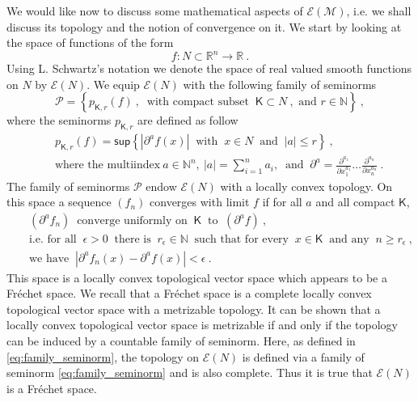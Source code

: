 \documentclass[11pt]{book}
\renewcommand{\sup}{\mathsf{sup}}
\newcommand{\abs}[1]{\left|#1\right|}
\newcommand{\Ecal}{\mathcal{E}}
\newcommand{\Mcal}{\mathcal{M}}
\newcommand{\Pcal}{\mathcal{P}}
\newcommand{\Nbb}{\mathbb{N}}
\newcommand{\Rbb}{\mathbb{R}}
\newcommand{\Ksf}{\mathsf{K}}
\theoremstyle{break}
\begin{document}
We would like now to discuss some mathematical aspects of $\Ecal(\Mcal)$, i.e. we shall discuss its topology and the notion of convergence on it. We start by looking at the space of functions of the form
%
\begin{equation*}
f : N \subset \Rbb^n \to \Rbb \ .
\end{equation*}
%
Using L. Schwartz's notation we denote the space of real valued smooth functions on $N$ by $\Ecal(N)$. We equip $\Ecal(N)$ with the following family of seminorms
%
\begin{equation}
\Pcal = \left\{ p_{\Ksf,r}(f) \ , \ \mbox{ with compact subset } \ \Ksf \subset N \ , \mbox{ and } r \in \Nbb \right\} \ ,
\label{eq:family_seminorm}
\end{equation}
%
where the seminorms $p_{\Ksf,r}$ are defined as follow
%
\begin{eqnarray}
&& p_{\Ksf,r}(f) = \sup \left\{ \abs{\partial^a f(x)} \ \mbox{ with } \ x \in N \ \mbox{ and } \ \abs{a} \leq r  \right\} \ , \nonumber \\
&& \mbox{where the multiindex} \ a \in \Nbb^n, \ \abs{a} = \sum_{i=1}^n a_i, \ \mbox{ and } \ \partial^a = \frac{\partial^{a_1}}{\partial x_1^{a_1}} \dots \frac{\partial^{a_n}}{\partial x_n^{a_n}} \ .
\label{eq:conv_multiindex}
\end{eqnarray}
%
The family of seminorms $\Pcal$ endow $\Ecal(N)$ with a locally convex topology. On this space a sequence $(f_n)$ converges with limit $f$ if for all $a$ and all compact $\Ksf$,
%
\begin{eqnarray*}
&& (\partial^a f_n) \ \mbox{ converge uniformly on } \ \Ksf \ \mbox{ to } \ (\partial^a f) \ , \\
&& \mbox{i.e. for all } \ \epsilon > 0 \ \mbox{ there is } \ r_\epsilon \in \Nbb \ \mbox{ such that for every } \  x \in \Ksf \ \mbox{ and any } \ n \geq r_\epsilon \ , \\
&& \mbox{we have } \ \abs{\partial^a f_n(x) - \partial^a f(x)} < \epsilon \ . 
\end{eqnarray*}
%
This space is a locally convex topological vector space which appears to be a Fréchet space. We recall that a Fréchet space is a complete locally convex topological vector space with a metrizable topology. It can be shown that a locally convex topological vector space is metrizable if and only if the topology can be induced by a countable family of seminorm. Here, as defined in \eqref{eq:family_seminorm}, the topology on $\Ecal(N)$ is defined via a family of seminorm \eqref{eq:family_seminorm} and is also complete. Thus it is true that $\Ecal(N)$ is a Fréchet space.
\end{document}
